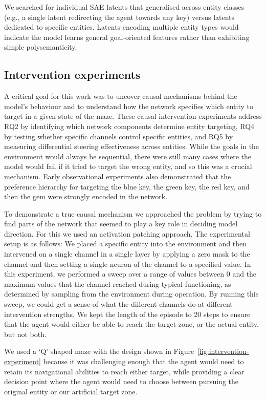     We searched for individual SAE latents that generalised across entity classes (e.g., a single latent redirecting the agent towards any key) versus latents dedicated to specific entities. Latents encoding multiple entity types would indicate the model learns general goal-oriented features rather than exhibiting simple polysemanticity.

    \subsection{Intervention experiments}
    \label{subsubsec:steering_interventions}
    A critical goal for this work was to uncover causal mechanisms behind the model's behaviour and to understand how the network specifies which entity to target in a given state of the maze. These causal intervention experiments address RQ2 by identifying which network components determine entity targeting, RQ4 by testing whether specific channels control specific entities, and RQ5 by measuring differential steering effectiveness across entities. While the goals in the environment would always be sequential, there were still many cases where the model would fail if it tried to target the wrong entity, and so this was a crucial mechanism. Early observational experiments also demonstrated that the preference hierarchy for targeting the blue key, the green key, the red key, and then the gem were strongly encoded in the network.

    To demonstrate a true causal mechanism we approached the problem by trying to find parts of the network that seemed to play a key role in deciding model direction. For this we used an activation patching approach. The experimental setup is as follows:
    We placed a specific entity into the environment and then intervened on a single channel in a single layer by applying a zero mask to the channel and then setting a single neuron of the channel to a specified value. In this experiment, we performed a sweep over a range of values between 0 and the maximum values that the channel reached during typical functioning, as determined by sampling from the environment during operation. By running this sweep, we could get a sense of what the different channels do at different intervention strengths. We kept the length of the episode to 20 steps to ensure that the agent would either be able to reach the target zone, or the actual entity, but not both.
    
    We used a `Q' shaped maze with the design shown in Figure~\ref{fig:intervention-experiment} because it was challenging enough that the agent would need to retain its navigational abilities to reach either target, while providing a clear decision point where the agent would need to choose between pursuing the original entity or our artificial target zone. 
    
